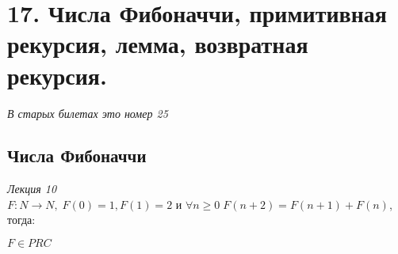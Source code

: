         
\section{17. Числа Фибоначчи, примитивная рекурсия, лемма, возвратная рекурсия.}
\emph{В старых билетах это номер 25}\\

    \subsection{Числа Фибоначчи}
    \emph{Лекция 10}\\
    
        $F: N \rightarrow N,\; F(0) = 1, F(1) = 2 \text{ и } \forall n \geq 0\; F(n+2) = F(n+1) + F(n)$, тогда:
        
        $F \in PRC$\\
